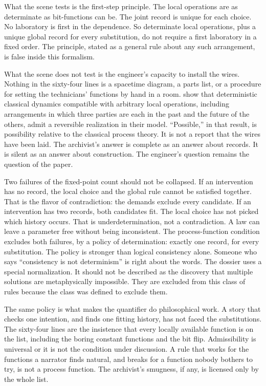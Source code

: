 \documentclass[11pt]{article}
\begin{document}
What the scene tests is the first-step principle. The local operations are as determinate as bit-functions can be. The joint record is unique for each choice. No laboratory is first in the dependence. So determinate local operations, plus a unique global record for every substitution, do not require a first laboratory in a fixed order. The principle, stated as a general rule about any such arrangement, is false inside this formalism.

What the scene does not test is the engineer’s capacity to install the wires. Nothing in the sixty-four lines is a spacetime diagram, a parts list, or a procedure for setting the technicians’ functions by hand in a room. \citet{baumeler2019} show that deterministic classical dynamics compatible with arbitrary local operations, including arrangements in which three parties are each in the past and the future of the others, admit a reversible realization in their model. ``Possible,'' in that result, is possibility relative to the classical process theory. It is not a report that the wires have been laid. The archivist’s answer is complete as an answer about records. It is silent as an answer about construction. The engineer’s question remains the question of the paper.

Two failures of the fixed-point count should not be collapsed. If an intervention has no record, the local choice and the global rule cannot be satisfied together. That is the flavor of contradiction: the demands exclude every candidate. If an intervention has two records, both candidates fit. The local choice has not picked which history occurs. That is underdetermination, not a contradiction. A law can leave a parameter free without being inconsistent. The process-function condition excludes both failures, by a policy of determination: exactly one record, for every substitution. The policy is stronger than logical consistency alone. Someone who says ``consistency is not determinism'' is right about the words. The dossier uses a special normalization. It should not be described as the discovery that multiple solutions are metaphysically impossible. They are excluded from this class of rules because the class was defined to exclude them.

The same policy is what makes the quantifier do philosophical work. A story that checks one intention, and finds one fitting history, has not faced the substitutions. The sixty-four lines are the insistence that every locally available function is on the list, including the boring constant functions and the bit flip. Admissibility is universal or it is not the condition under discussion. A rule that works for the functions a narrator finds natural, and breaks for a function nobody bothers to try, is not a process function. The archivist’s smugness, if any, is licensed only by the whole list.
\end{document}
